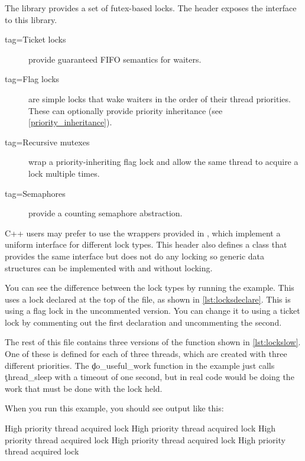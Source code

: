 The  library provides a set of futex-based locks.
The  header exposes the interface to this library.

\begin{description}
	\item[tag=Ticket locks]{ provide guaranteed FIFO semantics for waiters.}
	\item[tag=Flag locks]{  are simple locks that wake waiters in the order of their thread priorities.
	      These can optionally provide priority inheritance (see \ref{priority_inheritance}).}
	\item[tag=Recursive mutexes]{ wrap a priority-inheriting flag lock and allow the same thread to acquire a lock multiple times.}
	\item[tag=Semaphores]{ provide a counting semaphore abstraction.}
\end{description}

C++ users may prefer to use the wrappers provided in , which implement a uniform interface for different lock types.
This header also defines a  class that provides the same interface but does not do any locking so generic data structures can be implemented with and without locking.

You can see the difference between the lock types by running the  example.
This uses a lock declared at the top of the file, as shown in \ref{lst:locksdeclare}.
This is using a flag lock in the uncommented version. You can change it to using a ticket lock by commenting out the first declaration and uncommenting the second.

\codelisting[filename=examples/locking/locking.cc,marker=declare,label=lst:locksdeclare,caption="Declaring a lock in C++"]{}

The rest of this file contains three versions of the function shown in \ref{lst:lockslow}.
One of these is defined for each of three threads, which are created with three different priorities.
The \c{do_useful_work} function in the example just calls \c{thread_sleep} with a timeout of one second, but in real code would be doing the work that must be done with the lock held.

\codelisting[filename=examples/locking/locking.cc,marker=low,label=lst:lockslow,caption="The low-priority thread entry point for the locking example"]{}

When you run this example, you should see output like this:

\begin{console}
High priority thread acquired lock
High priority thread acquired lock
High priority thread acquired lock
High priority thread acquired lock
High priority thread acquired lock
\end{console}

